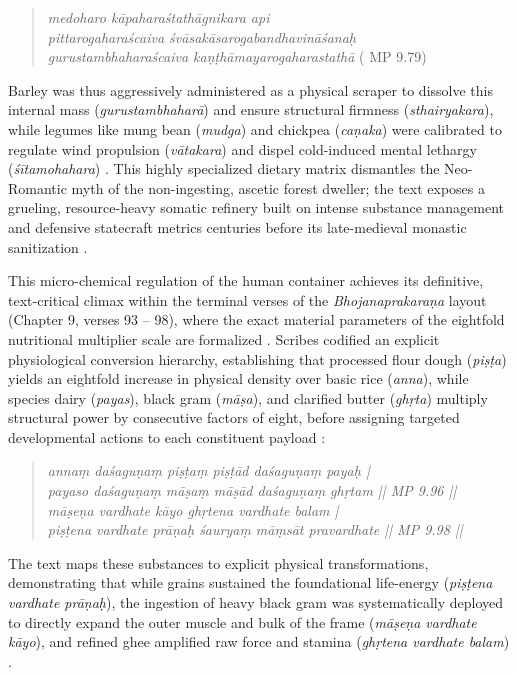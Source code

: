 \documentclass[11pt,twoside,letterpaper]{article}
\begin{document}
\begin{quote}
\textit{medoharo kāpaharaśtathāgnikara api \\
pittarogaharaścaiva śvāsakāsarogabandhavināśanaḥ  \\
gurustambhaharaścaiva kaṇṭhāmayarogaharastathā }( MP 9.79)
\end{quote}

Barley was thus aggressively administered as a physical scraper to dissolve this internal mass (\textit{gurustambhaharā}) and ensure structural firmness (\textit{sthairyakara}), while legumes like mung bean (\textit{mudga}) and chickpea (\textit{caṇaka}) were calibrated to regulate wind propulsion (\textit{vātakara}) and dispel cold-induced mental lethargy (\textit{śītamohahara}) \citep{MP_7}. This highly specialized dietary matrix dismantles the Neo-Romantic myth of the non-ingesting, ascetic forest dweller; the text exposes a grueling, resource-heavy somatic refinery built on intense substance management and defensive statecraft metrics centuries before its late-medieval monastic sanitization \citep{MP_7, Wujastyk2025}.

This micro-chemical regulation of the human container achieves its definitive, text-critical climax within the terminal verses of the \textit{Bhojanaprakaraṇa} layout (Chapter 9, verses 93 -- 98), where the exact material parameters of the eightfold nutritional multiplier scale are formalized \citep{MP_7}. Scribes codified an explicit physiological conversion hierarchy, establishing that processed flour dough (\textit{piṣṭa}) yields an eightfold increase in physical density over basic rice (\textit{anna}), while species dairy (\textit{payas}), black gram (\textit{māṣa}), and clarified butter (\textit{ghṛta}) multiply structural power by consecutive factors of eight, before assigning targeted developmental actions to each constituent payload \citep{MP_7}:

\begin{quote}
\small
\textit{annaṃ daśaguṇaṃ piṣṭaṃ piṣṭād daśaguṇaṃ payaḥ | \\
payaso daśaguṇaṃ māṣaṃ māṣād daśaguṇaṃ ghṛtam || MP 9.96 || \\
māṣeṇa vardhate kāyo ghṛtena vardhate balam | \\
piṣṭena vardhate prāṇaḥ śauryaṃ māṃsāt pravardhate || MP 9.98 ||}
\end{quote}

The text maps these substances to explicit physical transformations, demonstrating that while grains sustained the foundational life-energy (\textit{piṣṭena vardhate prāṇaḥ}), the ingestion of heavy black gram was systematically deployed to directly expand the outer muscle and bulk of the frame (\textit{māṣeṇa vardhate kāyo}), and refined ghee amplified raw force and stamina (\textit{ghṛtena vardhate balam}) \citep{MP_7}. 
\end{document}
